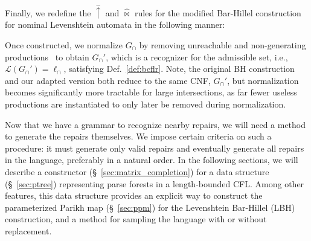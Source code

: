 \documentclass[runningheads]{llncs}
\begin{document}
  Finally, we redefine the $\hat\uparrow$ and $\hat\Join$ rules for the modified Bar-Hillel construction for nominal Levenshtein automata in the following manner:\vspace{-2pt}

  \vspace{2pt}

  \noindent Once constructed, we normalize $G_\cap$ by removing unreachable and non-generating productions~\cite{firsov2015certified} to obtain $G_\cap'$, which is a recognizer for the admissible set, i.e., $\mathcal{L}(G_\cap') = \ell_\cap$, satisfying Def.~\ref{def:bcflr}. Note, the original BH construction and our adapted version both reduce to the same CNF, $G_\cap'$, but normalization becomes significantly more tractable for large intersections, as far fewer useless productions are instantiated to only later be removed during normalization.



  Now that we have a grammar to recognize nearby repairs, we will need a method to generate the repairs themselves. We impose certain criteria on such a procedure: it must generate only valid repairs and eventually generate all repairs in the language, preferably in a natural order. In the following sections, we will describe a constructor (\S~\ref{sec:matrix_completion}) for a data structure (\S~\ref{sec:ptree}) representing parse forests in a length-bounded CFL. Among other features, this data structure provides an explicit way to construct the parameterized Parikh map (\S~\ref{sec:ppm}) for the Levenshtein Bar-Hillel (LBH) construction, and a method for sampling the language with or without replacement.
\end{document}
